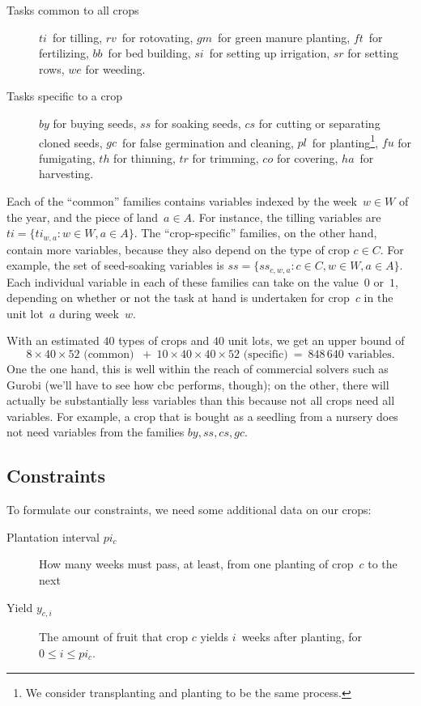 \documentclass[11pt]{amsart}
\numberwithin{equation}{section}
\begin{document}
\begin{description}
\item[Tasks common to all crops]  $ti$~for tilling, $rv$~for
  rotovating, $gm$~for green manure planting, $ft$~for fertilizing,
  $bb$~for bed building, $si$~for setting up irrigation, $sr$ for
  setting rows, $we$ for weeding.

\smallskip
\item[Tasks specific to a crop] $by$ for buying seeds, $ss$ for
  soaking seeds, $cs$ for cutting or separating cloned seeds, $gc$~for
  false germination and cleaning, $pl$~for planting\footnote{We
    consider transplanting and planting to be the same process.},
  $f\!u$ for fumigating, $th$ for thinning, $tr$ for trimming, $co$
  for covering, $ha$~for harvesting.
\end{description}

Each of the ``common'' families contains variables indexed by the
week~$w\in W$ of the year, and the piece of land~$a\in A$. For
instance, the tilling variables are $ti=\{ti_{w,a}:w\in W, a\in
A\}$. The ``crop-specific'' families, on the other hand, contain more
variables, because they also depend on the type of crop $c\in C$. For
example, the set of seed-soaking variables is $ss=\{ss_{c,w,a} : c\in
C, w\in W, a\in A\}$. Each individual variable in each of these
families can take on the value~$0$ or~$1$, depending on whether or not
the task at hand is undertaken for crop~$c$ in the unit lot~$a$
during week~$w$.

With an estimated $40$ types of crops and $40$ unit lots, we get an
upper bound of
\[
   8\times 40\times 52 \text{ (common) }
   \ + \ 
   10\times 40\times 40\times 52 \text{ (specific)}
   \ = \ 
   848\,640 \text{ variables.}
\]
One the one hand, this is well within the reach of commercial solvers
such as Gurobi (we'll have to see how cbc performs, though); on the
other, there will actually be substantially less variables than this
because not all crops need all variables. For example, a crop that is
bought as a seedling from a nursery does not need variables from the
families $by, ss, cs, gc$.

\subsection{Constraints}

To formulate our constraints, we need some additional data on our
crops:
\begin{description}
\item[Plantation interval $pi_{c}$] How many weeks must pass, at
  least, from one planting of crop~$c$ to the next

\item[Yield $y_{c,i}$] The amount of fruit that crop $c$ yields
  $i$~weeks after planting, for $0\le i\le pi_c$.
\end{description}
\end{document}
